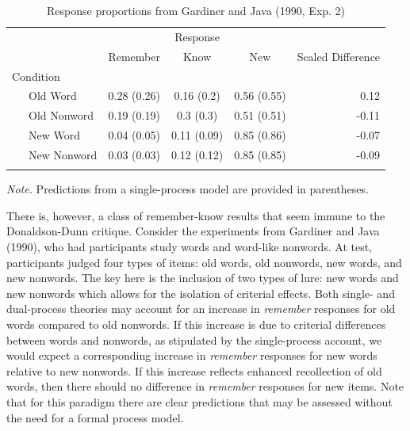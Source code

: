 \documentclass[english,,man,floatsintext]{apa6}
\begin{document}
\begin{table}[tbp]

\begin{center}
\begin{threeparttable}

\caption{\label{tab:tab2}Response proportions from Gardiner and Java (1990, Exp. 2)}

\begin{tabular}{lcccr}
\toprule
 & \multicolumn{3}{c}{Response}  &\\
\cmidrule(r){2-4}
 & \multicolumn{1}{c}{Remember} & \multicolumn{1}{c}{Know} & \multicolumn{1}{c}{New} & \multicolumn{1}{c}{Scaled Difference}\\
\midrule
Condition &  &  &  & \\
\ \ \ Old Word & 0.28 (0.26) & 0.16 (0.2) & 0.56 (0.55) & 0.12\\
\ \ \ Old Nonword & 0.19 (0.19) & 0.3 (0.3) & 0.51 (0.51) & -0.11\\
\ \ \ New Word & 0.04 (0.05) & 0.11 (0.09) & 0.85 (0.86) & -0.07\\
\ \ \ New Nonword & 0.03 (0.03) & 0.12 (0.12) & 0.85 (0.85) & -0.09\\
\bottomrule
\addlinespace
\end{tabular}

\begin{tablenotes}[para]
\normalsize{\textit{Note.} Predictions from a single-process model are provided in parentheses.}
\end{tablenotes}

\end{threeparttable}
\end{center}

\end{table}

There is, however, a class of remember-know results that seem immune to the Donaldson-Dunn critique. Consider the experiments from Gardiner and Java (1990), who had participants study words and word-like nonwords. At test, participants judged four types of items: old words, old nonwords, new words, and new nonwords.
The key here is the inclusion of two types of lure: new words and new nonwords which allows for the isolation of criterial effects. Both single- and dual-process theories may account for an increase in \emph{remember} responses for old words compared to old nonwords. If this increase is due to criterial differences between words and nonwords, as stipulated by the single-process account, we would expect a corresponding increase in \emph{remember} responses for new words relative to new nonwords. If this increase reflects enhanced recollection of old words, then there should no difference in \emph{remember} responses for new items. Note that for this paradigm there are clear predictions that may be assessed without the need for a formal process model.
\end{document}
